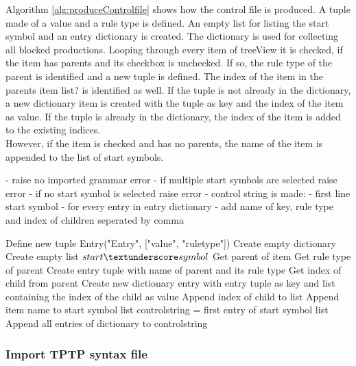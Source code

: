 Algorithm \ref{alg:produceControlfile} shows how the control file is produced. A tuple made of a value and a rule type is defined. An empty list for listing the start symbol and an entry dictionary is created. The dictionary is used for collecting all blocked productions. Looping through every item of treeView it is checked, if the item has parents and its checkbox is unchecked. If so, the rule type of the parent is identified and a new tuple is defined. The index of the item in the parents item list? is identified as well. If the tuple is not already in the dictionary, a new dictionary item is created with the tuple as key and the index of the item as value. If the tuple is already in the dictionary, the index of the item is added to the existing indices. \\
However, if the item is checked and has no parents, the name of the item is appended to the list of start symbols. 

- raise no imported grammar error
- if multiple start symbols are selected raise error
- if no start symbol is selected raise error
- control string is made: 
- first line start symbol
- for every entry in entry dictionary
- add name of key, rule type and index of children seperated by comma

\begin{algorithm}[H]
\caption{GUI Algorithm: produce\textunderscore controlfile}
\label{alg:produceControlfile}
\begin{algorithmic}[1] 
\State Define new tuple Entry("Entry", ["value", "rule\textunderscore type"])
\State Create empty dictionary
\State Create empty list $start\textunderscore symbol$
	\State Get parent of item
		\State Get rule type of parent
		\State Create entry tuple with name of parent and its rule type
		\State Get index of child from parent
			\State Create new dictionary entry with entry tuple as key and list containing the index of the child as value
		\Else
			\State Append index of child to list
		\EndIf
		\State Append item name to start symbol list
	\EndIf
\EndFor
\State control\textunderscore string = first entry of start symbol list
\State Append all entries of dictionary to control\textunderscore string
\end{algorithmic}
\end{algorithm} 

\subsubsection{Import \ac{TPTP} syntax file}\label{sec:ImplementationGUIImportFile}

